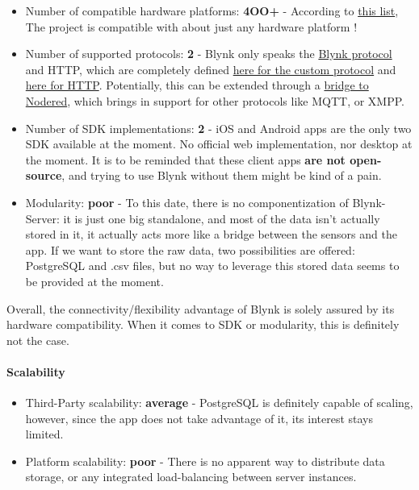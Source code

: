 \documentclass{article}
\begin{document}
\begin{itemize}
\item Number of compatible hardware platforms: \textbf{4OO+} - According to \href{https://github.com/blynkkk/blynkkk.github.io/blob/master/SupportedHardware.md}{this list}, The project is compatible with about just any hardware platform !
\item Number of supported protocols: \textbf{2} - Blynk only speaks the \href{https://github.com/blynkkk/blynk-server#blynk-protocol}{Blynk protocol} and HTTP, which are completely defined \href{https://github.com/blynkkk/blynk-library/blob/master/src/Blynk/BlynkProtocolDefs.h}{here for the custom protocol} and \href{http://docs.blynkapi.apiary.io/#reference/0/qr-for-project-cloning}{here for HTTP}. Potentially, this can be extended through a \href{https://github.com/tzapu/node-red-contrib-blynk-websockets}{bridge to Nodered}, which brings in support for other protocols like MQTT, or XMPP.
\item Number of SDK implementations: \textbf{2} - iOS and Android apps are the only two SDK available at the moment. No official web implementation, nor desktop at the moment. It is to be reminded that these client apps \textbf{are not open-source}, and trying to use Blynk without them might be kind of a pain.
\item Modularity: \textbf{poor} - To this date, there is no componentization of Blynk-Server: it is just one big standalone, and most of the data isn't actually stored in it, it actually acts more like a bridge between the sensors and the app. If we want to store the raw data, two possibilities are offered: PostgreSQL and .csv files, but no way to leverage this stored data seems to be provided at the moment.
\end{itemize}

Overall, the connectivity/flexibility advantage of Blynk is solely assured by its hardware compatibility. When it comes to SDK or modularity, this is definitely not the case.

\paragraph{Scalability}

\begin{itemize}
\item Third-Party scalability: \textbf{average} - PostgreSQL is definitely capable of scaling, however, since the app does not take advantage of it, its interest stays limited.
\item Platform scalability: \textbf{poor} - There is no apparent way to distribute data storage, or any integrated load-balancing between server instances.
\end{itemize}
\end{document}
